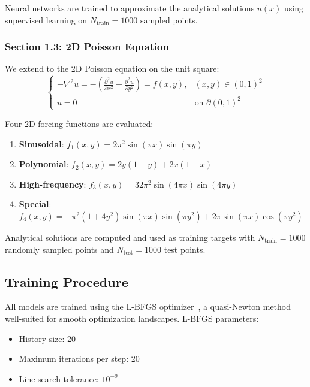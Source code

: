 \documentclass[11pt,a4paper]{article}
\begin{document}
Neural networks are trained to approximate the analytical solutions $u(x)$ using supervised learning on $N_{\text{train}} = 1000$ sampled points.

\subsubsection{Section 1.3: 2D Poisson Equation}

We extend to the 2D Poisson equation on the unit square:
\begin{equation}
\begin{cases}
-\nabla^2 u = -\left(\frac{\partial^2 u}{\partial x^2} + \frac{\partial^2 u}{\partial y^2}\right) = f(x,y), & (x,y) \in (0,1)^2 \\
u = 0 & \text{on } \partial (0,1)^2
\end{cases}
\end{equation}

Four 2D forcing functions are evaluated:
\begin{enumerate}
    \item \textbf{Sinusoidal}: $f_1(x,y) = 2\pi^2 \sin(\pi x) \sin(\pi y)$
    \item \textbf{Polynomial}: $f_2(x,y) = 2y(1-y) + 2x(1-x)$
    \item \textbf{High-frequency}: $f_3(x,y) = 32\pi^2 \sin(4\pi x) \sin(4\pi y)$
    \item \textbf{Special}: $f_4(x,y) = -\pi^2(1 + 4y^2)\sin(\pi x)\sin(\pi y^2) + 2\pi\sin(\pi x)\cos(\pi y^2)$
\end{enumerate}

Analytical solutions are computed and used as training targets with $N_{\text{train}} = 1000$ randomly sampled points and $N_{\text{test}} = 1000$ test points.

\subsection{Training Procedure}

All models are trained using the L-BFGS optimizer~\citep{liu1989limited}, a quasi-Newton method well-suited for smooth optimization landscapes. L-BFGS parameters:
\begin{itemize}
    \item History size: 20
    \item Maximum iterations per step: 20
    \item Line search tolerance: $10^{-9}$
\end{itemize}
\end{document}

